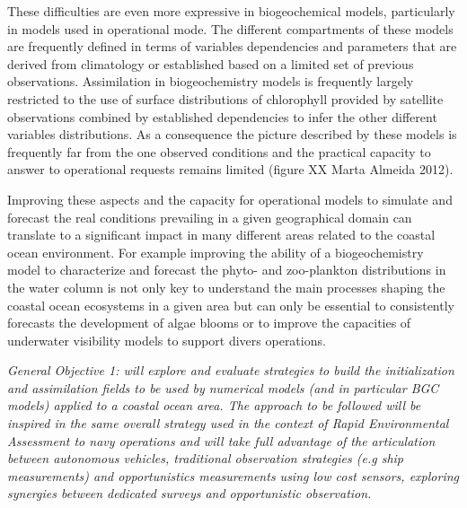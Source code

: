 These difficulties are even more expressive in biogeochemical models,
particularly in models used in operational mode. The different
compartments of these models are frequently defined in terms of
variables dependencies and parameters that are derived from climatology
or established based on a limited set of previous
observations. Assimilation in biogeochemistry models is frequently
largely restricted to the use of surface distributions of chlorophyll
provided by satellite observations combined by established dependencies
to infer the other different variables distributions. As a consequence
the picture described by these models is frequently far from the one
observed conditions and the practical capacity to answer to operational
requests remains limited (figure XX Marta Almeida 2012).
 
Improving these aspects and the capacity for operational models to
simulate and forecast the real conditions prevailing in a given
geographical domain can translate to a significant impact in many
different areas related to the coastal ocean environment. For example
improving the ability of a biogeochemistry model to characterize and
forecast the phyto- and zoo-plankton distributions in the water column
is not only key to understand the main processes shaping the coastal
ocean ecosystems in a given area but can only be essential to
consistently forecasts the development of algae blooms or to improve the
capacities of underwater visibility models to support divers operations.
 
\emph{General Objective 1: \proj will explore and evaluate strategies
  to build the initialization and assimilation fields to be used by
  numerical models (and in particular BGC models) applied to a coastal
  ocean area. The approach to be followed will be inspired in the same
  overall strategy used in the context of Rapid Environmental
  Assessment to navy operations and will take full advantage of the
  articulation between autonomous vehicles, traditional observation
  strategies (e.g ship measurements) and opportunistics measurements
  using low cost sensors, exploring synergies between dedicated
  surveys and opportunistic observation.}
 
